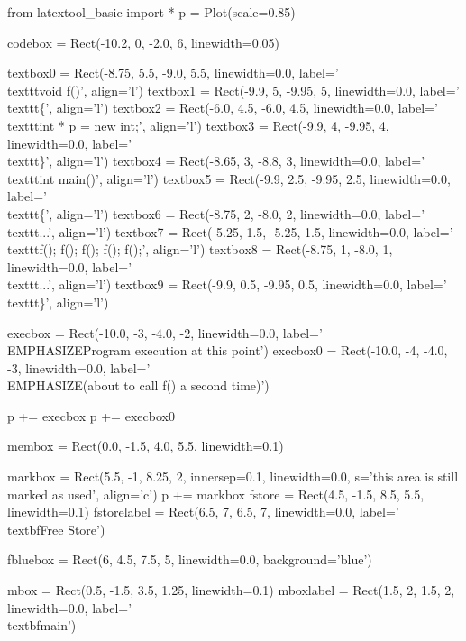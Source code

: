 \begin{python}
from latextool_basic import *
p = Plot(scale=0.85)

codebox = Rect(-10.2, 0, -2.0, 6, linewidth=0.05)

textbox0 = Rect(-8.75, 5.5, -9.0, 5.5, linewidth=0.0, label='\\texttt{void f()}', align='l')
textbox1 = Rect(-9.9, 5, -9.95, 5, linewidth=0.0, label='\\texttt{\{}', align='l')
textbox2 = Rect(-6.0, 4.5, -6.0, 4.5, linewidth=0.0, label='\\texttt{int * p = new int;}', align='l')
textbox3 = Rect(-9.9, 4, -9.95, 4, linewidth=0.0, label='\\texttt{\}}', align='l')
textbox4 = Rect(-8.65, 3, -8.8, 3, linewidth=0.0, label='\\texttt{int main()}', align='l')
textbox5 = Rect(-9.9, 2.5, -9.95, 2.5, linewidth=0.0, label='\\texttt{\{}', align='l')
textbox6 = Rect(-8.75, 2, -8.0, 2, linewidth=0.0, label='\\texttt{...}', align='l')
textbox7 = Rect(-5.25, 1.5, -5.25, 1.5, linewidth=0.0, label='\\texttt{f(); f(); f(); f(); f();}', align='l')
textbox8 = Rect(-8.75, 1, -8.0, 1, linewidth=0.0, label='\\texttt{...}', align='l')
textbox9 = Rect(-9.9, 0.5, -9.95, 0.5, linewidth=0.0, label='\\texttt{\}}', align='l')

execbox = Rect(-10.0, -3, -4.0, -2, linewidth=0.0,
               label='\\EMPHASIZE{Program execution at this point}')
execbox0 = Rect(-10.0, -4, -4.0, -3, linewidth=0.0,
               label='\\EMPHASIZE{(about to call f() a second time)}')

p += execbox
p += execbox0

membox = Rect(0.0, -1.5, 4.0, 5.5, linewidth=0.1)

markbox = Rect(5.5, -1, 8.25, 2, innersep=0.1, linewidth=0.0, s='this area is still marked as used', align='c')
p += markbox
fstore = Rect(4.5, -1.5, 8.5, 5.5, linewidth=0.1)
fstorelabel = Rect(6.5, 7, 6.5, 7, linewidth=0.0, label='\\textbf{Free Store}')

fbluebox = Rect(6, 4.5, 7.5, 5, linewidth=0.0, background='blue')

mbox = Rect(0.5, -1.5, 3.5, 1.25, linewidth=0.1)
mboxlabel = Rect(1.5, 2, 1.5, 2, linewidth=0.0, label='\\textbf{main}')


\end{python}
